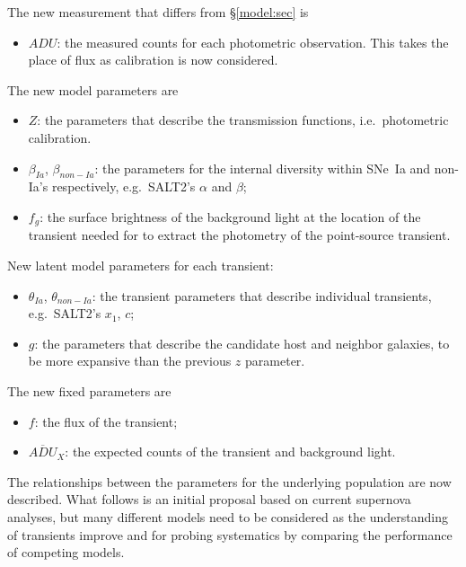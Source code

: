 \documentclass[preprint,3p]{elsarticle}
\begin{document}
The new measurement that differs from  \S\ref{model:sec} is
\begin{itemize}
\item $\mathit{ADU}$: the measured counts for each photometric observation.
This takes
the place of flux as calibration is now considered.
\end{itemize}
The new model parameters are
\begin{itemize}
\item $Z$: the parameters that describe the transmission functions, i.e.\ photometric calibration.
\item $\beta_{Ia}$, $\beta_{non-Ia}$: the parameters for the internal diversity within SNe~Ia and
non-Ia's respectively, e.g.\ SALT2's  $\alpha$ and $\beta$;
\item $f_g$: the surface brightness of the background light at the location of the transient
needed for to extract the photometry of the point-source transient.
\end{itemize}
New latent model parameters for each transient:
\begin{itemize}
\item $\theta_{Ia}$, $\theta_{non-Ia}$: the transient parameters that describe individual
transients, e.g.\ SALT2's $x_1$, $c$;
\item $g$: the parameters that describe the candidate host and neighbor galaxies,
to be more expansive than the previous $z$ parameter.
\end{itemize}
The new fixed parameters are
\begin{itemize}
\item{$f$}: the flux of the transient;
\item{$\overline{\mathit{ADU}}_X$}: the expected counts of the transient and background light.
\end{itemize}

The relationships between the parameters for the underlying population are now described.  What follows is an initial proposal
based on current supernova analyses, but many different models need to be
considered as the understanding of transients improve
and for probing systematics by comparing the
performance of competing models.
\end{document}
